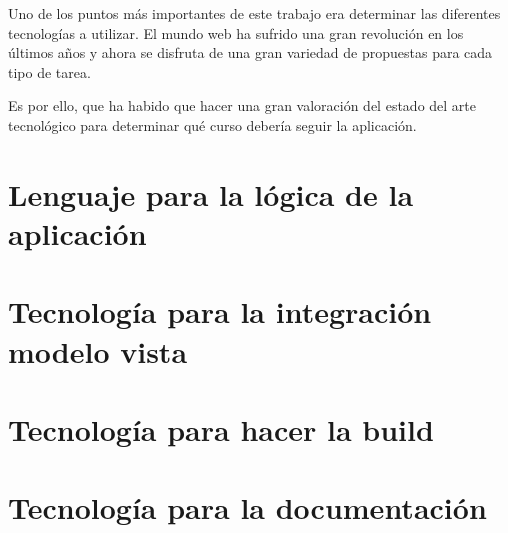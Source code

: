
Uno de los puntos más importantes de este trabajo era determinar las diferentes tecnologías
a utilizar. El mundo web ha sufrido una gran revolución en los últimos años y ahora
se disfruta de una gran variedad de propuestas para cada tipo de tarea.

Es por ello, que ha habido que hacer una gran valoración del estado del arte 
tecnológico para determinar qué curso debería seguir la aplicación.

\section{Lenguaje para la lógica de la aplicación}
\label{4:sec1}


\section{Tecnología para la integración modelo vista}
\label{4:sec2}


\section{Tecnología para hacer la build}
\label{4:sec3}


\section{Tecnología para la documentación}
\label{4:sec4}

